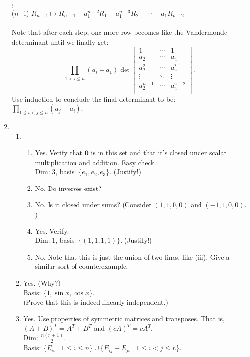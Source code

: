 \documentclass{article}
\begin{document}
\begin{enumerate}
	$\vdots$\\
	($n$ -1) $R_{n-1} \mapsto R_{n-1} - a_1^{n-2}R_1 - a_1^{n-3}R_2 -\cdots - a_1R_{n-2}$\\~\\
	Note that after each step, one more row becomes like the Vandermonde determinant until we finally get:
	\[\prod_{1 < i \le n}(a_i - a_1)
		\det
		\begin{bmatrix}
			1 & \cdots & 1\\
			a_2 & \cdots & a_n\\
			a_2^2 & \cdots & a_n^2\\
			\vdots & \ddots & \vdots \\
			a_2^{n-1} & \cdots & a_n^{n-2}\\
		\end{bmatrix}.\]
	Use induction to conclude the final determinant to be: $\displaystyle\prod_{1 \le i < j \le n}(a_j - a_i).$
	\fi
	\item \begin{enumerate} 
		\item \begin{enumerate}[nosep] 
			\item Yes. Verify that $\mathbf{0}$ is in this set and that it's closed under scalar multiplication and addition. Easy check.\\
			Dim: 3, basis: $\{e_1, e_2, e_3\}.$ \hfill (Justify!)
			\item No. Do inverses exist?
			\item No. Is it closed under sums? (Consider $(1, 1, 0, 0)$ and $(-1, 1, 0, 0).$)
			\item Yes. Verify.\\
			Dim: 1, basis: $\{(1, 1, 1, 1)\}.$ \hfill (Justify!)
			\item No. Note that this is just the union of two lines, like (iii). Give a similar sort of counterexample.
		\end{enumerate}
		\item Yes. (Why?)\\
		Basis: $\{1, \sin x, \cos x\}.$\\
		(Prove that this is indeed linearly independent.)
		\item Yes. Use properties of symmetric matrices and transposes. That is, $(A+B)^T = A^T + B^T$ and $(cA)^T = cA^T.$\\
		Dim: $\frac{n(n+1)}{2}.$\\
		Basis: $\{E_{ii} \mid 1 \le i \le n\} \cup \{E_{ij} + E_{ji} \mid 1 \le i < j \le n\}.$\\

\end{enumerate}
\end{enumerate}
\end{document}
